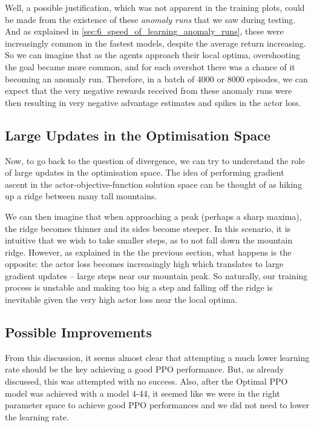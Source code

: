 Well, a possible justification, which was not apparent in the training plots, could be made from the existence of these \textit{anomaly runs} that we saw during testing. And as explained in \ref{sec:6_speed_of_learning_anomaly_runs}, these were increasingly common in the fastest models, despite the average return increasing. 
So we can imagine that as the agents approach their local optima, overshooting the goal became more common, and for each overshot there was a chance of it becoming an anomaly run.
Therefore, in a batch of 4000 or 8000 episodes, we can expect that the very negative rewards received from these anomaly runs were then resulting in very negative advantage estimates and spikes in the actor loss.

\subsection{Large Updates in the Optimisation Space}
Now, to go back to the question of divergence, we can try to understand the role of large updates in the optimisation space. The idea of performing gradient ascent in the actor-objective-function solution space can be thought of as hiking up a ridge between many tall mountains. 

We can then imagine that when approaching a peak (perhaps a sharp maxima), the ridge becomes thinner and its sides become steeper. In this scenario, it is intuitive that we wish to take smaller steps, as to not fall down the mountain ridge. 
However, as explained in the the previous section, what happens is the opposite: the actor loss becomes increasingly high which translates to large gradient updates -- large steps near our mountain peak. So naturally, our training process is unstable and making too big a step and falling off the ridge is inevitable given the very high actor loss near the local optima.

\subsection{Possible Improvements}
\label{subsec:6_possible_improvements}
From this discussion, it seems almost clear that attempting a much lower learning rate should be the key achieving a good PPO performance. But, as already discussed, this was attempted with no success. Also, after the Optimal PPO model was achieved with a model 4-44, it seemed like we were in the right parameter space to achieve good PPO performances and we did not need to lower the learning rate. 

